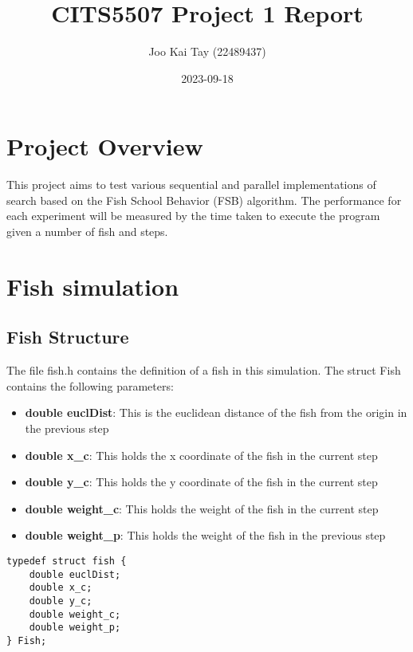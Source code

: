 \documentclass[
]{article}
\title{CITS5507 Project 1 Report}
\author{Joo Kai Tay (22489437)}
\date{2023-09-18}
\providecommand{\tightlist}{%
  \setlength{\itemsep}{0pt}\setlength{\parskip}{0pt}}
\begin{document}
\maketitle

\hypertarget{project-overview}{%
\section{Project Overview}\label{project-overview}}

This project aims to test various sequential and parallel
implementations of search based on the Fish School Behavior (FSB)
algorithm. The performance for each experiment will be measured by the
time taken to execute the program given a number of fish and steps.

\hypertarget{fish-simulation}{%
\section{Fish simulation}\label{fish-simulation}}

\hypertarget{fish-structure}{%
\subsection{Fish Structure}\label{fish-structure}}

The file fish.h contains the definition of a fish in this simulation.
The struct Fish contains the following parameters:

\begin{itemize}
\tightlist
\item
  \textbf{double euclDist}: This is the euclidean distance of the fish
  from the origin in the previous step
\item
  \textbf{double x\_c}: This holds the x coordinate of the fish in the
  current step
\item
  \textbf{double y\_c}: This holds the y coordinate of the fish in the
  current step
\item
  \textbf{double weight\_c}: This holds the weight of the fish in the
  current step
\item
  \textbf{double weight\_p}: This holds the weight of the fish in the
  previous step
\end{itemize}

\begin{verbatim}
typedef struct fish {
    double euclDist;
    double x_c;
    double y_c;
    double weight_c;
    double weight_p;
} Fish;
\end{verbatim}
\end{document}
